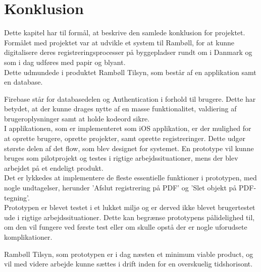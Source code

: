 \chapter{Konklusion}
Dette kapitel har til formål, at beskrive den samlede 
konklusion for projektet. \\

Formålet med projektet var at udvikle et system til Rambøll, for at kunne digitalisere deres registreringsprocesser på byggepladser rundt om i Danmark og som i dag udføres med papir og blyant. \\
Dette udmundede i produktet Rambøll Tilsyn, som består af en applikation samt en database.

Firebase står for databasedelen og Authentication i forhold til brugere. Dette har betydet, at der kunne drages nytte af en masse funktionalitet, valdiering af brugeroplysninger samt at holde kodeord sikre. \\
I applikationen, som er implementeret som iOS applikation, er der mulighed for at oprette brugere, oprette projekter, samt oprette registreringer. Dette udgør største delen af det flow, som blev designet for systemet. En prototype vil kunne bruges som pilotprojekt og testes i rigtige arbejdssituationer, mens der blev arbejdet på et endeligt produkt. \\
Det er lykkedes at implementere de fleste essentielle funktioner i prototypen, med nogle undtagelser, herunder 'Afslut registrering på PDF' og 'Slet objekt på PDF-tegning'. \\
Prototypen er blevet testet i et lukket miljø og er derved ikke blevet brugertestet ude i rigtige arbejdssituationer. Dette kan begrænse prototypens pålidelighed til, om den vil fungere ved første test eller om skulle opstå der er nogle uforudsete komplikationer.

Rambøll Tilsyn, som prototypen er i dag næsten et minimum viable product, og vil med videre arbejde
kunne sættes i drift inden for en overskuelig tidshorisont.


